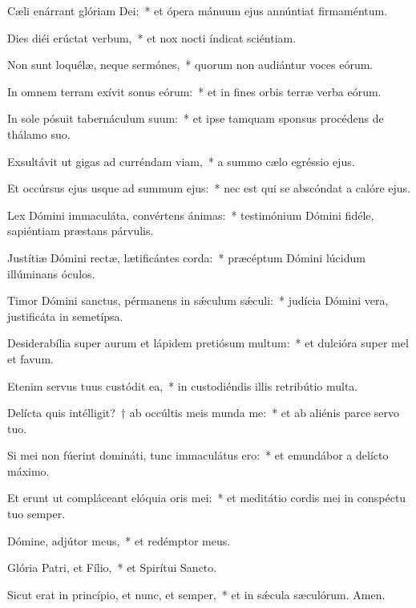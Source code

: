 \item Cæli enárrant glóriam Dei:~* et ópera mánuum ejus annúntiat firmaméntum.

\item Dies diéi erúctat verbum,~* et nox nocti índicat sciéntiam.

\item Non sunt loquélæ, neque sermónes,~* quorum non audiántur voces eórum.

\item In omnem terram exívit sonus eórum:~* et in fines orbis terræ verba eórum.

\item In sole pósuit tabernáculum suum:~* et ipse tamquam sponsus procédens de thálamo suo.

\item Exsultávit ut gigas ad curréndam viam,~* a summo cælo egréssio ejus.

\item Et occúrsus ejus usque ad summum ejus:~* nec est qui se abscóndat a calóre ejus.

\item Lex Dómini immaculáta, convértens ánimas:~* testimónium Dómini fidéle, sapiéntiam præstans párvulis.

\item Justítiæ Dómini rectæ, lætificántes corda:~* præcéptum Dómini lúcidum illúminans óculos.

\item Timor Dómini sanctus, pérmanens in sǽculum sǽculi:~* judícia Dómini vera, justificáta in semetípsa.

\item Desiderabília super aurum et lápidem pretiósum multum:~* et dulcióra super mel et favum.

\item Etenim servus tuus custódit ea,~* in custodiéndis illis retribútio multa.

\item Delícta quis intélligit?~† ab occúltis meis munda me:~* et ab aliénis parce servo tuo.

\item Si mei non fúerint domináti, tunc immaculátus ero:~* et emundábor a delícto máximo.

\item Et erunt ut compláceant elóquia oris mei:~* et meditátio cordis mei in conspéctu tuo semper.

\item Dómine, adjútor meus,~* et redémptor meus.

\item Glória Patri, et Fílio,~* et Spirítui Sancto.

\item Sicut erat in princípio, et nunc, et semper,~* et in sǽcula sæculórum. Amen.

